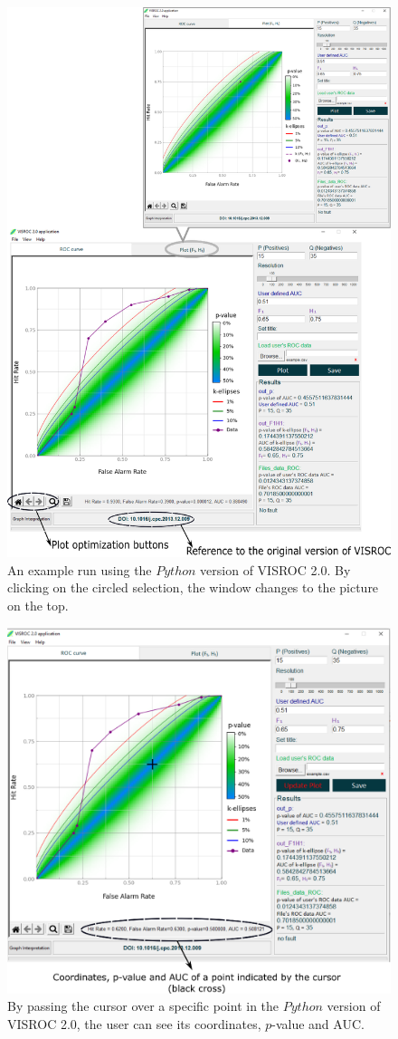\documentclass[preprint,12pt]{elsarticle}
\begin{document}
\begin{figure}
\includegraphics[scale=0.55]{Figure4.eps}
\caption{An example run using the $Python$ version of VISROC 2.0. By clicking on the circled selection, the window changes to the picture on the top.}\label{fig:4}
\end{figure}

\begin{figure}
\includegraphics[scale=0.6]{Figure5.eps}
\caption{By passing the cursor over a specific point in the $Python$ version of VISROC 2.0, the user can see its coordinates, $p$-value and AUC.}\label{fig:5}
\end{figure}
\end{document}

